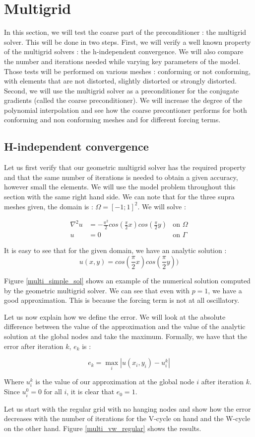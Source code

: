\section{Multigrid}
In this section, we will test the coarse part of the preconditioner : the multigrid solver. This will be done in two steps. First, we will verify a well known property of the multigrid solvers : the h-independent convergence. We will also compare the number and iterations needed while varying key parameters of the model. Those tests will be performed on various meshes : conforming or not conforming, with elements that are not distorted, slightly distorted or strongly distorted. Second, we will use the multigrid solver as a preconditioner for the conjugate gradients (called the coarse preconditioner). We will increase the degree of the polynomial interpolation and see how the coarse precontioner performs for both conforming and non conforming meshes and for different forcing terms.

\subsection{H-independent convergence}
Let us first verify that our geometric multigrid solver has the required property and that the same number of iterations is needed to obtain a given accuracy, however small the elements. We will use the model problem throughout this section with the same right hand side. We can note that for the three supra meshes given, the domain  is : $\Omega = [-1;1]^2$. We will solve : 

\begin{align}
\nabla^2 u &= -\frac{\pi^2}{2}cos(\frac{\pi}{2}x)cos(\frac{\pi}{2}y) &\text{on $\Omega$} \\
u &= 0  &\text{on $\Gamma$}
\end{align}

It is easy to see that for the given domain, we have an analytic solution : 
$$u(x,y) = cos(\frac{\pi}{2}x)cos(\frac{\pi}{2}y))$$

Figure \ref{multi_simple_sol} shows an example of the numerical solution computed by the geometric multigrid solver. We can see that even with $p=1$, we have a good approximation. This is because the forcing term is not at all oscillatory. 


Let us now explain how we define the error. We will look at the absolute difference between the value of the approximation and the value of the analytic solution at the global nodes and take the maximum. Formally, we have that the error after iteration $k$, $e_k$ is :

$$e_k = \max_i |u(x_i,y_i) - u_i^k|$$

Where $u_i^k$ is the value of our approximation at the global node $i$ after iteration $k$. Since $u_i^0 = 0$ for all $i$, it is clear that $e_0 = 1$.

Let us start with the regular grid with no hanging nodes and show how the error decreases with the number of iterations for the V-cycle on hand and the W-cycle on the other hand. Figure \ref{multi_vw_regular} shows the results. 


